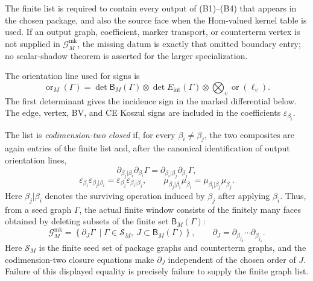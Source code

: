 \begin{defn}
  The finite list is required to contain every output of (B1)--(B4) that
  appears in the chosen package, and also the source face when the
  Hom-valued kernel table is used.  If an output graph, coefficient,
  marker transport, or counterterm vertex is not supplied in
  \(\mathcal G^{\mathrm{mk}}_M\), the missing datum is exactly that
  omitted boundary entry; no scalar-shadow theorem is asserted for the
  larger specialization.

  The orientation line used for signs is
  \[
    \operatorname{or}_M(\Gamma)
      =
    \det\mathsf B_M(\Gamma)\otimes
    \det E_{\mathrm{int}}(\Gamma)\otimes
    \bigotimes_v \operatorname{or}(\ell_v).
  \]
  The first determinant gives the incidence sign in the marked
  differential below.  The edge, vertex, BV, and CE Koszul signs are
  included in the coefficients \(\varepsilon_{\beta_i}\).

  The list is \emph{codimension-two closed} if, for every
  \(\beta_i\neq\beta_j\), the two composites are again entries of the
  finite list and, after the canonical identification of output orientation
  lines,
  \[
    \partial_{\beta_j|\beta_i}\partial_{\beta_i}\Gamma
      =
    \partial_{\beta_i|\beta_j}\partial_{\beta_j}\Gamma,
  \]
  \[
    \varepsilon_{\beta_i}\varepsilon_{\beta_j|\beta_i}
      =
    \varepsilon_{\beta_j}\varepsilon_{\beta_i|\beta_j},
    \qquad
    \mu_{\beta_j|\beta_i}\mu_{\beta_i}
      =
    \mu_{\beta_i|\beta_j}\mu_{\beta_j}.
    \label{eq:app-codim-two-marked-closure}
  \]
  Here \(\beta_j|\beta_i\) denotes the surviving operation induced by
  \(\beta_j\) after applying \(\beta_i\).  Thus, from a seed graph
  \(\Gamma\), the actual finite window consists of the finitely many
  faces obtained by deleting subsets of the finite set
  \(\mathsf B_M(\Gamma)\):
  \[
    \mathcal G^{\mathrm{mk}}_M
      =
    \left\{
      \partial_J\Gamma\ \middle|
      \Gamma\in\mathcal S_M,\ J\subset\mathsf B_M(\Gamma)
    \right\},
    \qquad
    \partial_J=\partial_{\beta_{j_k}}\cdots\partial_{\beta_{j_1}} .
  \]
  Here \(\mathcal S_M\) is the finite seed set of package graphs and
  counterterm graphs, and the codimension-two closure equations make
  \(\partial_J\) independent of the chosen order of \(J\).  Failure of this
  displayed equality is precisely failure to supply the finite graph list.
\end{defn}

